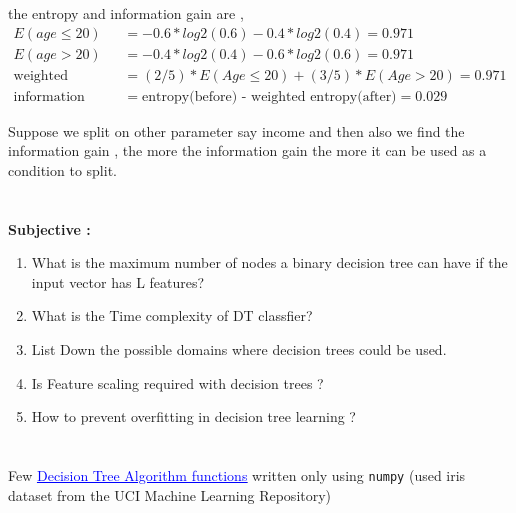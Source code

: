 \documentclass[12pt,a4paper]{article}
\begin{document}
the entropy and information gain are ,
\begin{align*}
    E(age \le 20) &=  -0.6 * log2(0.6) - 0.4 * log2(0.4) = 0.971 \\
    E(age > 20) &= -0.4 * log2(0.4) - 0.6 * log2(0.6) = 0.971 \\
    \text{weighted entropy} &= (2/5) * E(Age \le 20) + (3/5) * E(Age > 20) = 0.971 \\
    \text{information gain} &= \text{entropy(before) - weighted entropy(after)} = 0.029
\end{align*}

Suppose we split on other parameter say income and then also we find the information gain , the more the information gain the more it can be used as a condition to split.

\section{}

\textbf{Subjective : }
\begin{enumerate}
    \item What is the maximum number of nodes a binary decision tree can have if the input vector has L features?
    \item What is the Time complexity of DT classfier?
    \item List Down the possible domains where decision trees could be used.
    \item Is Feature scaling required with decision trees ?
    \item How to prevent overfitting in decision tree learning ?\\[10pt]
\end{enumerate}


\section{}
Few \href{https://github.com/IITH-Epoch/Handouts-2022-2023/blob/main/Decision%20Trees/Decision%20Trees.ipynb}{\textcolor{blue}{\underline{Decision Tree Algorithm functions}}} written only using \texttt{numpy} (used iris dataset from the UCI Machine Learning Repository)\\
\end{document}
